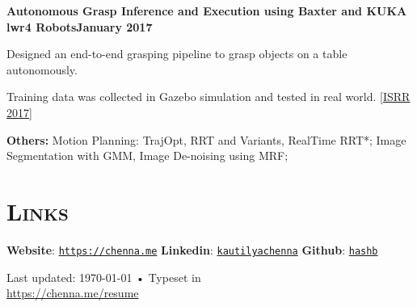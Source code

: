 \documentclass[margin, line]{resume}
\begin{document}
\begin{resume}
    \textbf{Autonomous Grasp Inference and Execution using Baxter and KUKA lwr4 Robots}\hfill \textbf{January 2017}
    \begin{list2}
        \item Designed an end-to-end grasping pipeline to grasp objects on a table autonomously.
        \item Training data was collected in Gazebo simulation and tested in real world. [\href{https://robot-learning.cs.utah.edu/project/grasp\_inference}{ISRR 2017}]
    \end{list2}\vspace{-3.2mm}

    \textbf{Others:} Motion Planning: TrajOpt, RRT and Variants, RealTime RRT*; Image Segmentation with GMM, Image De-noising using MRF;


%
%



    \sectionline
    \section{\mysidestyle \textsc{Links}}
    \textbf{Website}: \texttt{\href{https://chenna.me}{https://chenna.me}} \hspace{2mm}%
    \textbf{Linkedin}: \texttt{\href{https://www.linkedin.com/in/kautilyachenna/}{kautilyachenna}} \hspace{2mm}%
    \textbf{Github}: \texttt{\href{https://github.com/hashb}{hashb}}
    \vspace{-3.2mm}

\begin{center}
    {\scriptsize  Last updated: \today\- •\- Typeset in {\XeTeX }\\
        \href{https://chenna.me/resume}{https://chenna.me/resume}}
\end{center}

\end{resume}
\end{document}
